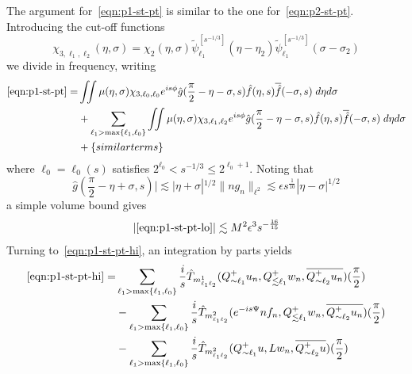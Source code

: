 \documentclass[letterpaper, reqno,final]{amsart}
\newcommand{\fhPi}{\frac{\pi}{2}}
\newcommand{\discrAvg}{\Psi}
\newcommand{\invLinProp}[1][t]{e^{-i#1\discrAvg}}
\newcommand{\btext}[1]{\left\{\textup{#1}\right\}}
\newcommand{\bsim}{\btext{similar terms}}
\begin{document}
The argument for~\eqref{eqn:p1-st-pt} is similar to the one for~\eqref{eqn:p2-st-pt}.  Introducing the cut-off functions
    \begin{equation*}
    \chi_{3,\ell_1,\ell_2}(\eta,\sigma) = \chi_2(\eta,\sigma) \tilde{\psi}^{[s^{-1/3}]}_{\ell_1}(\eta - \eta_2) \tilde{\psi}^{[s^{-1/3}]}_{\ell_1}(\sigma - \sigma_2)
\end{equation*}
we divide in frequency, writing
\begin{subequations}\begin{align}
    \eqref{eqn:p1-st-pt} =& \iint \mu(\eta,\sigma) \chi_{3,\ell_0,\ell_0}  e^{is\phi} \hat{g}(\fhPi-\eta-\sigma,s) \hat{f}(\eta,s) \overline{\hat{f}}(-\sigma,s) \;d\eta d\sigma\label{eqn:p1-st-pt-lo}\\
    &+ \sum_{\ell_1 > \max\{\ell_1, \ell_0\}} \iint \mu(\eta,\sigma) \chi_{3,\ell_1,\ell_2}  e^{is\phi} \hat{g}(\fhPi-\eta-\sigma,s) \hat{f}(\eta,s) \overline{\hat{f}}(-\sigma,s) \;d\eta d\sigma\label{eqn:p1-st-pt-hi}\\
    &+\bsim\notag
\end{align}\end{subequations}
where $\ell_0 = \ell_0(s)$ satisfies $2^{\ell_0} < s^{-1/3} \leq 2^{\ell_0+1}$.  Noting that \begin{equation*}
    \hat{g}(\fhPi -\eta+\sigma,s)| \lesssim |\eta + \sigma|^{1/2} \lVert ng_n \rVert_{\ell^2} \lesssim \epsilon s^{\frac{1}{10}}|\eta - \sigma|^{1/2}
\end{equation*}
a simple volume bound gives
\begin{equation*}
    |\eqref{eqn:p1-st-pt-lo}| \lesssim M^2\epsilon^3s^{-\frac{16}{15}}
\end{equation*}
Turning to~\eqref{eqn:p1-st-pt-hi}, an integration by parts yields
\begin{equation*}\begin{split}
    \eqref{eqn:p1-st-pt-hi} =& \sum_{\ell_1 > \max\{\ell_1, \ell_0\}}  \frac{i}{s} \hat{T}_{m^1_{\ell_1\ell_2}}(Q_{\sim \ell_1}^{+} u_n,Q_{\lesssim \ell_1}^{+}w_n,\overline{Q_{\sim \ell_2}^{+}u_n})(\fhPi) \\
    &- \sum_{\ell_1 > \max\{\ell_1, \ell_0\}} \frac{i}{s} \hat{T}_{m^2_{\ell_1\ell_2}}(\invLinProp[s] nf_n,Q_{\lesssim \ell_1}^{+}w_n,\overline{Q_{\sim \ell_2}^{+}u_n})(\fhPi)\\
    &- \sum_{\ell_1 > \max\{\ell_1, \ell_0\}}  \frac{i}{s} \hat{T}_{m^2_{\ell_1\ell_2}}(Q_{\sim \ell_1}^{+} u,Lw_n,\overline{Q_{\sim \ell_2}^{+}u})(\fhPi)\\
\end{split}\end{equation*}
\end{document}

